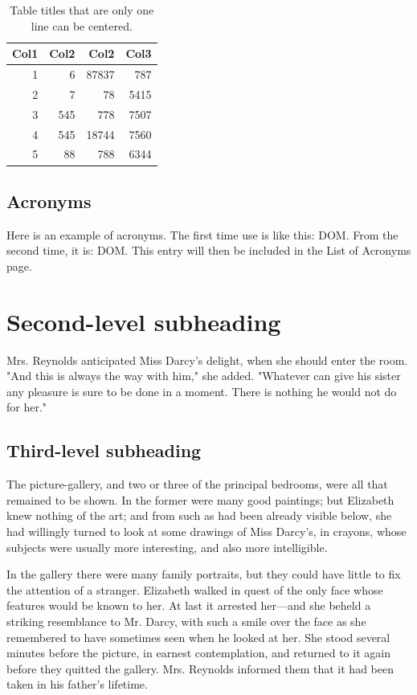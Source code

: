 \begin{table}[!htb]
\centering
\caption{Table titles that are only one line can be centered.}
\label{tab:my-table2}
\begin{tabular}{r r r r} 
 \hline
 Col1 & Col2 & Col2 & Col3 \\ [0.5ex] 
 \hline\hline
 1 & 6 & 87837 & 787 \\ 
 2 & 7 & 78 & 5415 \\
 3 & 545 & 778 & 7507 \\
 4 & 545 & 18744 & 7560 \\
 5 & 88 & 788 & 6344 \\ [1ex] 
 \hline
\end{tabular}

\end{table}

\subsection{Acronyms}

Here is an example of acronyms. The first time use is like this: \ac{DOM}. From the second time, it is: \ac{DOM}. This entry will then be included in the List of Acronyms page.

\section{Second-level subheading}


Mrs. Reynolds anticipated Miss Darcy's delight, when she should enter the room. "And this is always the way with him," she added. "Whatever can give his sister any pleasure is sure to be done in a moment. There is nothing he would not do for her."


\subsection{Third-level subheading}

The picture-gallery, and two or three of the principal bedrooms, were all that remained to be shown. In the former were many good paintings; but Elizabeth knew nothing of the art; and from such as had been already visible below, she had willingly turned to look at some drawings of Miss Darcy's, in crayons, whose subjects were usually more interesting, and also more intelligible.

In the gallery there were many family portraits, but they could have little to fix the attention of a stranger. Elizabeth walked in quest of the only face whose features would be known to her. At last it arrested her—and she beheld a striking resemblance to Mr. Darcy, with such a smile over the face as she remembered to have sometimes seen when he looked at her. She stood several minutes before the picture, in earnest contemplation, and returned to it again before they quitted the gallery. Mrs. Reynolds informed them that it had been taken in his father's lifetime.

